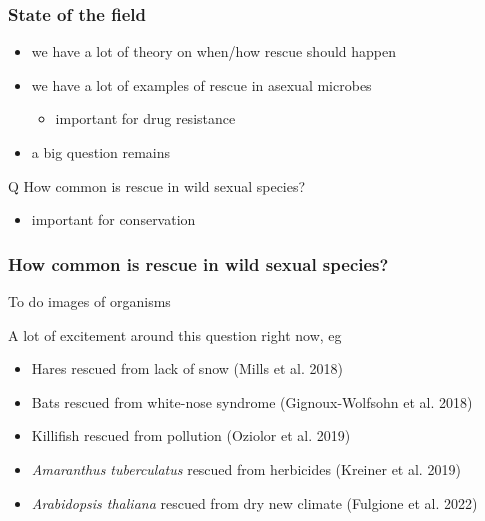 \documentclass{beamer}
\begin{document}
\begin{frame}
	\frametitle{State of the field}

	\begin{itemize}
		\item we have a lot of theory on when/how rescue should happen \pause
		\item we have a lot of examples of rescue in asexual microbes \pause
		\begin{itemize}
			\item important for drug resistance \pause
		\end{itemize}
		\item a big question remains \pause
	\end{itemize}
	
	\begin{block}{Q}
		How common is rescue in wild sexual species?
	\end{block}

	\begin{itemize}
		\item important for conservation
	\end{itemize}

\end{frame}


\begin{frame}
	\frametitle{How common is rescue in wild sexual species?}

	\begin{alertblock}{To do}
		images of organisms
	\end{alertblock}
	
	A lot of excitement around this question right now, eg \pause
	
	\begin{itemize}
		\item Hares rescued from lack of snow (Mills et al. 2018) \pause
		\item Bats rescued from white-nose syndrome (Gignoux-Wolfsohn et al. 2018) \pause
		\item Killifish rescued from pollution (Oziolor et al. 2019) \pause
		\item \textit{Amaranthus tuberculatus} rescued from herbicides (Kreiner et al. 2019) \pause
		\item \textit{Arabidopsis thaliana} rescued from dry new climate (Fulgione et al. 2022)
	\end{itemize}

\end{frame}
\end{document}
